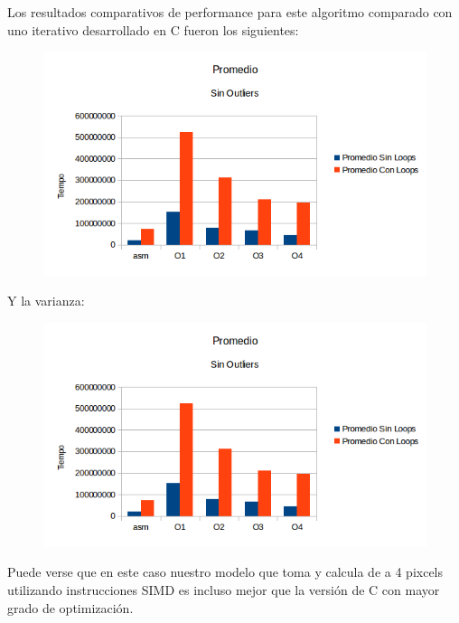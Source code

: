 \documentclass[a4paper]{article}
\begin{document}
Los resultados comparativos de performance para este algoritmo comparado con uno iterativo desarrollado en C fueron los siguientes:

\begin{figure}[h!]
  \begin{center}
  \includegraphics[scale=0.66]{GraficosTesting/sie/PSO.png}
  \label{nombreparareferenciar7}
  \end{center}
\end{figure}

\newpage

Y la varianza:

\begin{figure}[h!]
  \begin{center}
  \includegraphics[scale=0.66]{GraficosTesting/sie/PSO.png}
  \label{nombreparareferenciar8}
  \end{center}
\end{figure}

Puede verse que en este caso nuestro modelo que toma y calcula de a 4 pixcels utilizando instrucciones SIMD es incluso mejor que la versión de C con mayor grado de optimización.
\end{document}

